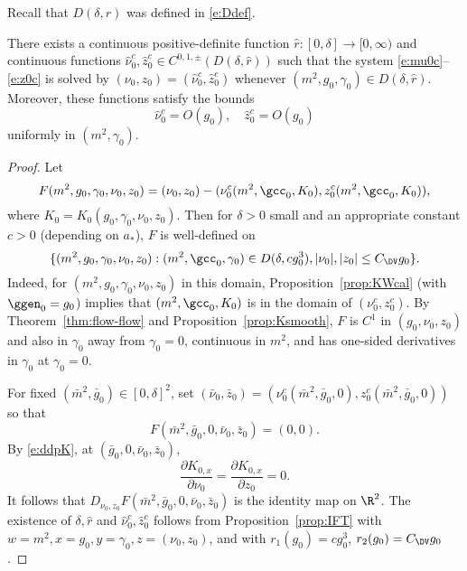 Recall that $D(\delta, r)$ was defined in \eqref{e:Ddef}.

\begin{prop}
\label{prop:nuzhat}
There exists a continuous positive-definite function $\hat r : [0, \delta] \to [0, \infty)$
and continuous functions
$\hat\nu_0^c, \hat z_0^c \in C^{0,1,\pm}(D(\delta, \hat r))$ such that
the system \eqref{e:mu0c}--\eqref{e:z0c} is solved by $(\nu_0, z_0) = (\hat\nu_0^c, \hat z_0^c)$
whenever $(m^2, g_0, \gamma_0) \in D(\delta, \hat r)$.
Moreover, these functions satisfy the bounds
\begin{equation}
\label{e:hat-est-re}
\hat\nu_0^c = O(g_0),
\quad
\hat z_0^c = O(g_0)
\end{equation}
uniformly in $(m^2, \gamma_0)$.
\end{prop}

\begin{proof}
Let
\begin{equation}
F(m^2, g_0, \gamma_0, \nu_0, z_0)
= (\nu_0, z_0)
  -
  (\nu_0^c(m^2, \gcc_0, K_0),
  z_0^c(m^2, \gcc_0, K_0)
),
\end{equation}
where $K_0 = K_0(g_0, \gamma_0, \nu_0, z_0)$.
Then for $\delta > 0$ small and an appropriate constant $c > 0$ (depending on $a_*$),
$F$ is well-defined on
\begin{equation}
\{ (m^2, g_0, \gamma_0, \nu_0, z_0) : (m^2, \gcc_0, \gamma_0) \in D(\delta, c g_0^3),
|\nu_0|, |z_0| \leq C_\DV g_0 \}.
\end{equation}
Indeed, for $(m^2, g_0, \gamma_0, \nu_0, z_0)$ in this domain,
Proposition~\ref{prop:KWcal} (with $\ggen_0 = g_0$) implies that $(m^2, \gcc_0, K_0)$ is in the domain of
$(\nu_0^c, z_0^c)$.
By Theorem~\ref{thm:flow-flow} and Proposition~\ref{prop:Ksmooth},
$F$ is $C^1$ in $(g_0, \nu_0, z_0)$
and also in $\gamma_0$ away from $\gamma_0 = 0$,
continuous in $m^2$, and has one-sided derivatives in $\gamma_0$ at $\gamma_0 = 0$.

For fixed $(\bar m^2, {\bar g_0}) \in [0, \delta]^2$,
set $({\bar\nu_0}, \bar z_0) = (\nu_0^c(\bar m^2, \bar g_0, 0), z_0^c(\bar m^2, \bar g_0, 0))$
so that
\begin{equation}
F(\bar m^2, \bar g_0, 0, \bar\nu_0, \bar z_0) = (0, 0).
\end{equation}
By \eqref{e:ddpK}, at $(\bar g_0, 0, \bar\nu_0, \bar z_0)$,
\begin{equation}
\frac{\partial K_{0,x}}{\partial\nu_0}
= \frac{\partial K_{0,x}}{\partial z_0} = 0.
\end{equation}
It follows that $D_{\nu_0,z_0} F(\bar m^2, \bar g_0, 0, \bar\nu_0, \bar z_0)$
is the identity map on $\R^2$.
The existence of $\delta, \hat r$ and $\hat\nu_0^c, \hat z_0^c$
follows from Proposition~\ref{prop:IFT} with
$w = m^2, x = g_0, y = \gamma_0, z = (\nu_0, z_0)$,
and with $r_1(g_0) = c g_0^3$, $r_2(g_0) = C_\DV g_0$.


\end{proof}
